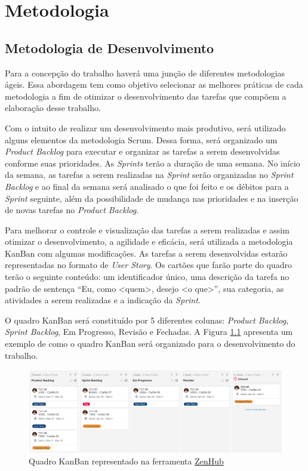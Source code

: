 \chapter[Metodologia]{Metodologia}

\section{Metodologia de Desenvolvimento}

Para a concepção do trabalho haverá uma junção de diferentes metodologias ágeis. Essa abordagem tem como objetivo selecionar as melhores práticas de cada metodologia a fim de otimizar o desenvolvimento das tarefas que compõem a elaboração desse trabalho.  

Com o intuito de realizar um desenvolvimento mais produtivo, será utilizado alguns elementos da metodologia Scrum. Dessa forma, será organizado um \textit{Product Backlog} para executar e organizar as tarefas a serem desenvolvidas conforme suas prioridades. As \textit{Sprints} terão a duração de uma semana. No início da semana, as tarefas a serem realizadas na \textit{Sprint} serão organizadas no \textit{Sprint Backlog} e ao final da semana será analisado o que foi feito e os débitos para a \textit{Sprint} seguinte, além da possibilidade de mudança nas prioridades e na inserção de novas tarefas no \textit{Product Backlog}. 

Para melhorar o controle e visualização das tarefas a serem realizadas e assim otimizar o desenvolvimento, a agilidade e eficácia, será utilizada a metodologia KanBan com algumas modificações. As tarefas a serem desenvolvidas estarão representadas no formato de \textit{User Story}. Os cartões que farão parte do quadro terão o seguinte conteúdo: um identificador único, uma descrição da tarefa no padrão de sentença ``Eu, como <quem>, desejo <o que>'', sua categoria, as atividades a serem realizadas e a indicação da \textit{Sprint}.

O quadro KanBan será constituído por 5 diferentes colunas: \textit{Product Backlog}, \textit{Sprint Backlog}, Em Progresso, Revisão e Fechadas. A Figura \ref{quadroKanBan} apresenta um exemplo de como o quadro KanBan será organizado para o desenvolvimento do trabalho. 

\begin{figure}[h]
	\centering
	\includegraphics[keepaspectratio=true,scale=0.375]{figuras/kanban.png}
	\caption{Quadro KanBan representado na ferramenta \href{https://www.zenhub.com/}{ZenHub}}
	\label{quadroKanBan}
\end{figure}


